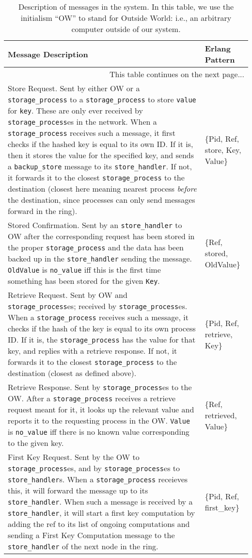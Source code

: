 \documentclass[12pt,letterpaper]{article}
\renewcommand{\tt}[1]{\texttt{#1}}
\newcommand{\sh}{\tt{store\_handler}}
\renewcommand{\sp}{\tt{storage\_process}}
\begin{document}
\begin{longtable}{p{5in}p{1.8in}}
\caption{Description of messages in the system.  In this table, we use the initialism ``OW'' to stand for Outside World: i.e., an arbitrary computer outside of our system.}
\label{msgTable}\\
\textbf{Message Description} & \textbf{Erlang Pattern} \\
\hline
\endhead
\hline \multicolumn{2}{|r|}{{This table continues on the next page...}} \\ \hline
\endfoot
\endlastfoot

Store Request. Sent by either OW or a \sp{} to a \sp{} to store \tt{value} for \tt{key}. These are only ever received by \sp es in the network. When a \sp{} receives such a message, it first checks if the hashed key is equal to its own ID. If it is, then it stores the value for the specified key, and sends a \tt{backup\_store} message to its \sh. If not, it forwards it to the closest \sp{} to the destination (closest here meaning nearest process \textit{before} the destination, since processes can only send messages forward in the ring). &
\{Pid, Ref, store, Key, Value\} \\

Stored Confirmation. Sent by an \sh{} to OW after the corresponding request has been stored in the proper \sp{} and the data has been backed up in the \sh{} sending the message.  \tt{OldValue} is \tt{no\_value} iff this is the first time something has been stored for the given \tt{Key}. &
\{Ref, stored, OldValue\} \\

Retrieve Request. Sent by OW and \sp es; received by \sp es. When a \sp{} receives such a message, it checks if the hash of the key is equal to its own process ID. If it is, the \sp{} has the value for that key, and replies with a retrieve response. If not, it forwards it to the closest \sp{} to the destination (closest as defined above). &
\{Pid, Ref, retrieve, Key\} \\

Retrieve Response. Sent by \sp es to the OW. After a \sp{} receives a retrieve request meant for it, it looks up the relevant value and reports it to the requesting process in the OW.  \tt{Value} is \tt{no\_value} iff there is no known value corresponding to the given key. &
\{Ref, retrieved, Value\} \\

First Key Request. Sent by the OW to \sp es, and by \sp es to \sh s. When a \sp{} receieves this, it will forward the message up to its \sh. When such a message is received by a \sh, it will start a first key computation by adding the ref to its list of ongoing computations and sending a First Key Computation message to the \sh{} of the next node in the ring. &
\{Pid, Ref, first\_key\} \\


\end{longtable}
\end{document}
